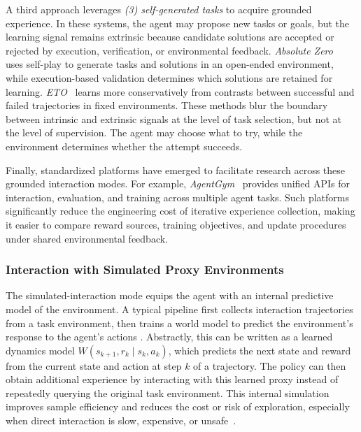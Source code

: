 A third approach leverages \textit{(3) self-generated tasks} to acquire grounded experience. In these systems, the agent may propose new tasks or goals, but the learning signal remains extrinsic because candidate solutions are accepted or rejected by execution, verification, or environmental feedback. \textit{Absolute Zero}~\citep{zhao2025absolute} uses self-play to generate tasks and solutions in an open-ended environment, while execution-based validation determines which solutions are retained for learning. \textit{ETO}~\citep{song2024trial} learns more conservatively from contrasts between successful and failed trajectories in fixed environments. These methods blur the boundary between intrinsic and extrinsic signals at the level of task selection, but not at the level of supervision. The agent may choose what to try, while the environment determines whether the attempt succeeds.

Finally, standardized platforms have emerged to facilitate research across these grounded interaction modes. For example, \textit{AgentGym}~\citep{xi2024agentgym} provides unified APIs for interaction, evaluation, and training across multiple agent tasks. Such platforms significantly reduce the engineering cost of iterative experience collection, making it easier to compare reward sources, training objectives, and update procedures under shared environmental feedback.

\subsubsection{Interaction with Simulated Proxy Environments}
\label{sec:Efficient_Interaction_with_Simulated_Environments}
\label{sec:World_Models}


The simulated-interaction mode equips the agent with an internal predictive model of the environment. A typical pipeline first collects interaction trajectories from a task environment, then trains a world model to predict the environment's response to the agent's actions \citep{schmidhuber1990making, ha2018world}. Abstractly, this can be written as a learned dynamics model $W(s_{k+1}, r_k \mid s_k, a_k)$, which predicts the next state and reward from the current state and action at step $k$ of a trajectory. The policy can then obtain additional experience by interacting with this learned proxy instead of repeatedly querying the original task environment. This internal simulation improves sample efficiency and reduces the cost or risk of exploration, especially when direct interaction is slow, expensive, or unsafe~\citep{ding2025understanding, richens2025general}.

